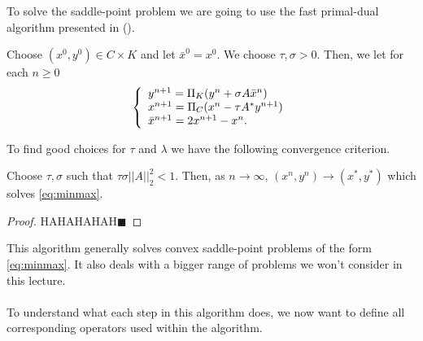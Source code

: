         To solve the saddle-point problem we are going to use the fast primal-dual algorithm presented in (\cite{Pock-et-al-iccv09}).

            \begin{algorithm}\label{alg:cremers}
                Choose $(x^{0}, y^{0}) \in C \times K$ and let $\bar{x}^{0} = x^{0}$. We choose $\tau, \sigma > 0$. Then, we let for each $n \ge 0$
                    \begin{equation}
                        \left\{ 
                            \begin{array}{l l}
                              y^{n+1} = \Pi_{K} (y^{n} + \sigma A \bar{x}^{n}) \\
                              x^{n+1} = \Pi_{C} (x^{n} - \tau A^{*} y^{n+1}) \\
                              \bar{x}^{n+1} = 2x^{n+1} - x^{n}.
                            \end{array}
                        \right.
                    \end{equation}
            \end{algorithm}

        To find good choices for $\tau$ and $\lambda$ we have the following convergence criterion.

            \begin{theorem}[Convergence]
                Choose $\tau, \sigma$ such that $\tau\sigma ||A||_{2}^{2} < 1$. Then, as $n \longrightarrow \infty$, $(x^{n}, y^{n}) \longrightarrow (x^{*}, y^{*})$ which solves \ref{eq:minmax}.
            \end{theorem}

        \begin{proof}
            HAHAHAHAH$\blacksquare$
        \end{proof}

        This algorithm generally solves convex saddle-point problems of the form \ref{eq:minmax}. It also deals with a bigger range of problems we won't consider in this lecture.\\ \\

            To understand what each step in this algorithm does, we now want to define all corresponding operators used within the algorithm.

